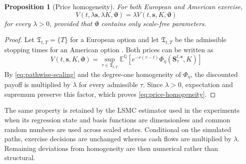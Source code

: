 \documentclass{article}
\numberwithin{equation}{subsection}
\newtheorem{proposition}[theorem]{Proposition}
\theoremstyle{definition}
\theoremstyle{remark}
\begin{document}
\begin{proposition}[Price homogeneity]
For both European and American exercise,
\begin{equation}
V
\left(
t,\lambda\boldsymbol{s},\lambda K,\boldsymbol{\vartheta}
\right)
=
\lambda
V
\left(
t,\boldsymbol{s},K,\boldsymbol{\vartheta}
\right)
\label{eq:price-homogeneity}
\end{equation}
for every \(\lambda>0\), provided that
\(\boldsymbol{\vartheta}\) contains only scale-free parameters.
\end{proposition}

\begin{proof}
Let \(\mathfrak{T}_{t,T}=\{T\}\) for a European option and let
\(\mathfrak{T}_{t,T}\) be the admissible stopping times for an American option
\cite{jaillet1990variational}.
Both prices can be written as
\begin{equation}
V(t,\boldsymbol{s},K,\boldsymbol{\vartheta})
=
\sup_{\tau\in\mathfrak{T}_{t,T}}
\mathbb{E}^{\mathbb{Q}}
\left[
e^{-r(\tau-t)}
\Phi_\eta
\left(
\boldsymbol{S}_\tau^{t,\boldsymbol{s}},K
\right)
\right]
\end{equation}
By \eqref{eq:pathwise-scaling} and the degree-one homogeneity of
\(\Phi_\eta\), the discounted payoff is multiplied by \(\lambda\) for every
admissible \(\tau\). Since \(\lambda>0\), expectation and supremum preserve this
factor, which proves \eqref{eq:price-homogeneity}.
\end{proof}

The same property is retained by the LSMC estimator used in the experiments
\cite{longstaff2001leastSquares,glasserman2004montecarlo}
when its regression state and basis functions are dimensionless and common
random numbers are used across scaled states. Conditional on the simulated
paths, exercise decisions are unchanged whereas cash flows are multiplied by
\(\lambda\). Remaining deviations from homogeneity are then numerical rather
than structural.
\end{document}
